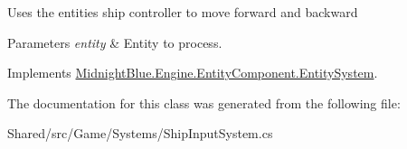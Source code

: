Uses the entities ship controller to move forward and backward 


\begin{DoxyParams}{Parameters}
{\em entity} & Entity to process.\\
\hline
\end{DoxyParams}


Implements \hyperlink{class_midnight_blue_1_1_engine_1_1_entity_component_1_1_entity_system_a94aa715ac6bfe9a720c3d12d56c7598c}{Midnight\+Blue.\+Engine.\+Entity\+Component.\+Entity\+System}.



The documentation for this class was generated from the following file\+:\begin{DoxyCompactItemize}
\item 
Shared/src/\+Game/\+Systems/Ship\+Input\+System.\+cs\end{DoxyCompactItemize}
